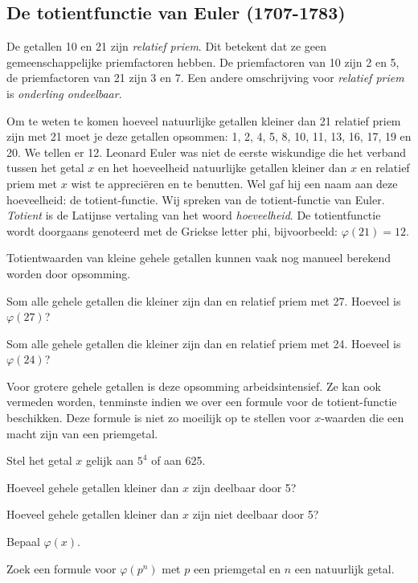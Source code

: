 \subsection{De totientfunctie van Euler (1707-1783)}

De getallen 10 en 21 zijn \emph{relatief priem}. Dit betekent dat ze geen gemeenschappelijke priemfactoren hebben. De priemfactoren van 10 zijn 2 en 5, de priemfactoren van 21 zijn 3 en 7. Een andere omschrijving voor \emph{relatief priem} is \emph{onderling ondeelbaar}.

Om te weten te komen hoeveel natuurlijke getallen kleiner dan 21 relatief priem zijn met 21 moet je deze getallen opsommen: 1, 2, 4, 5, 8, 10, 11, 13, 16, 17, 19 en 20. We tellen er 12. Leonard Euler was niet de eerste wiskundige die het verband tussen het getal $x$ en het hoeveelheid natuurlijke getallen kleiner dan $x$ en relatief priem met $x$ wist te appreciëren en te benutten. Wel gaf hij een naam aan deze hoeveelheid: de totient-functie. Wij spreken van de totient-functie van Euler. \emph{Totient} is de Latijnse vertaling van het woord \emph{hoeveelheid}. De totientfunctie wordt doorgaans genoteerd met de Griekse letter phi, bijvoorbeeld: $\varphi(21)=12$.

\begin{oef} Totientwaarden van kleine gehele getallen kunnen vaak nog manueel berekend worden door opsomming.

\begin{enumoef}
\item Som alle gehele getallen die kleiner zijn dan en relatief priem met 27. Hoeveel is $\varphi(27)$?
\item Som alle gehele getallen die kleiner zijn dan en relatief priem met 24. Hoeveel is $\varphi(24)$?
\end{enumoef}
\end{oef}

Voor grotere gehele getallen is deze opsomming arbeidsintensief. Ze kan ook vermeden worden, tenminste indien we over een formule voor de totient-functie beschikken. Deze formule is niet zo moeilijk op te stellen voor $x$-waarden die een macht zijn van een priemgetal.

\begin{oef} Stel het getal $x$ gelijk aan $5^4$ of aan 625.

\begin{enumoef}
\item Hoeveel gehele getallen kleiner dan $x$ zijn deelbaar door 5? 
\item Hoeveel gehele getallen kleiner dan $x$ zijn niet deelbaar door 5?
\item Bepaal $\varphi(x)$.
\item Zoek een formule voor $\varphi(p^n)$ met $p$ een priemgetal en $n$ een natuurlijk getal.
\end{enumoef}
\end{oef}

